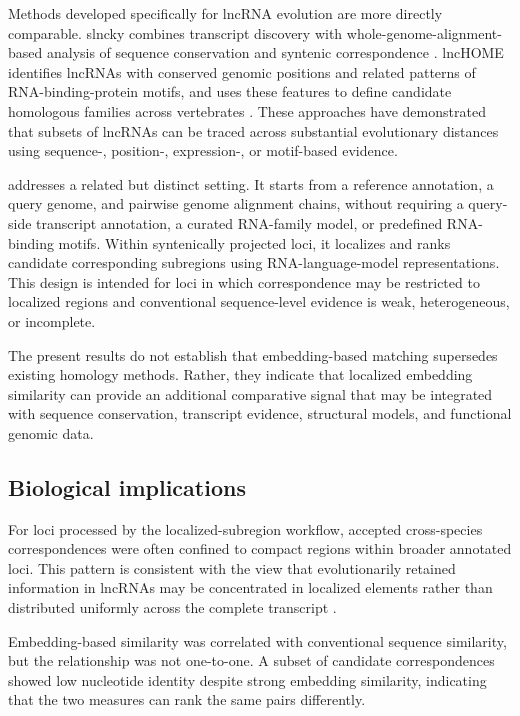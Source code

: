 Methods developed specifically for lncRNA evolution are more directly comparable.
slncky combines transcript discovery with whole-genome-alignment-based analysis
of sequence conservation and syntenic correspondence
\citep{chenEvolutionaryAnalysisMammals2016}. lncHOME identifies lncRNAs with
conserved genomic positions and related patterns of RNA-binding-protein motifs,
and uses these features to define candidate homologous families across
vertebrates
\citep{huangComputationalPredictionExperimental2024}. These approaches have
demonstrated that subsets of lncRNAs can be traced across substantial
evolutionary distances using sequence-, position-, expression-, or motif-based
evidence.

\curia{} addresses a related but distinct setting. It starts from a reference
annotation, a query genome, and pairwise genome alignment chains, without
requiring a query-side transcript annotation, a curated RNA-family model, or
predefined RNA-binding motifs. Within syntenically projected loci, it localizes
and ranks candidate corresponding subregions using RNA-language-model
representations. This design is intended for loci in which correspondence may be
restricted to localized regions and conventional sequence-level evidence is
weak, heterogeneous, or incomplete.

The present results do not establish that embedding-based matching supersedes
existing homology methods. Rather, they indicate that localized embedding
similarity can provide an additional comparative signal that may be integrated
with sequence conservation, transcript evidence, structural models, and
functional genomic data.

\subsection{Biological implications}

For loci processed by the localized-subregion workflow, accepted
cross-species correspondences were often confined to compact regions within
broader annotated loci. This pattern is consistent with the view that
evolutionarily retained information in lncRNAs may be concentrated in localized
elements rather than distributed uniformly across the complete transcript
\citep{hezroniPrinciplesLongNoncoding2015,
    ulitskyEvolutionRescueUsing2016,
    mattickLongNoncodingRNAs2023}.

Embedding-based similarity was correlated with conventional sequence similarity,
but the relationship was not one-to-one. A subset of candidate correspondences
showed low nucleotide identity despite strong embedding similarity, indicating
that the two measures can rank the same pairs differently.

